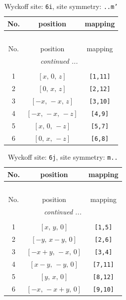 \documentclass[fleqn,8pt]{jsarticle}
\begin{document}
\renewcommand{\arraystretch}{1.2}
\begin{longtable}{ccc}
\caption{Wyckoff site: {\tt 6i}, site symmetry: {\tt ..m'}}
 \\
 \hline \hline
No. & position & mapping \\ \hline \endfirsthead

\multicolumn{2}{l}{\tablename\ \thetable{}} \\
 \hline \hline
No. & position & mapping \\ \hline \endhead

 \hline \hline
\multicolumn{2}{r}{\footnotesize\it continued ...} \\ \endfoot

 \hline \hline
\multicolumn{2}{r}{} \\ \endlastfoot

1 & $\left[ x,\, 0,\, z \right]$ & {\tt [1,11]} \\ \hline
2 & $\left[ 0,\, x,\, z \right]$ & {\tt [2,12]} \\ \hline
3 & $\left[ - x,\, - x,\, z \right]$ & {\tt [3,10]} \\ \hline
4 & $\left[ - x,\, - x,\, - z \right]$ & {\tt [4,9]} \\ \hline
5 & $\left[ x,\, 0,\, - z \right]$ & {\tt [5,7]} \\ \hline
6 & $\left[ 0,\, x,\, - z \right]$ & {\tt [6,8]} \\
\end{longtable}
\renewcommand{\arraystretch}{1.2}
\begin{longtable}{ccc}
\caption{Wyckoff site: {\tt 6j}, site symmetry: {\tt m..}}
 \\
 \hline \hline
No. & position & mapping \\ \hline \endfirsthead

\multicolumn{2}{l}{\tablename\ \thetable{}} \\
 \hline \hline
No. & position & mapping \\ \hline \endhead

 \hline \hline
\multicolumn{2}{r}{\footnotesize\it continued ...} \\ \endfoot

 \hline \hline
\multicolumn{2}{r}{} \\ \endlastfoot

1 & $\left[ x,\, y,\, 0 \right]$ & {\tt [1,5]} \\ \hline
2 & $\left[ - y,\, x - y,\, 0 \right]$ & {\tt [2,6]} \\ \hline
3 & $\left[ - x + y,\, - x,\, 0 \right]$ & {\tt [3,4]} \\ \hline
4 & $\left[ x - y,\, - y,\, 0 \right]$ & {\tt [7,11]} \\ \hline
5 & $\left[ y,\, x,\, 0 \right]$ & {\tt [8,12]} \\ \hline
6 & $\left[ - x,\, - x + y,\, 0 \right]$ & {\tt [9,10]} \\
\end{longtable}
\end{document}
